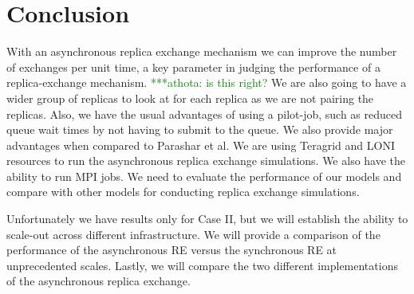 \documentclass[a4paper,10pt]{article}
\newcommand{\jhanote}[1]{ {\textcolor{red} { ***shantenu: #1 }}}
\newcommand{\athotanote}[1]{ {\textcolor{green} { ***athota: #1 }}}
\newcommand{\jhanote}[1]{}
\newcommand{\athotanote}[1]{}
\begin{document}
\section{Conclusion}
With an asynchronous replica exchange mechanism we can improve the number of exchanges per unit time, 
a key parameter in judging the performance of a replica-exchange mechanism. \athotanote{is this right? } 
We are also going to have a wider group of replicas to look at for each replica as we are not pairing 
the replicas. Also, we have the usual advantages of using a pilot-job, such as reduced queue wait 
times by not having to submit to the queue. 
We also provide major advantages when compared to Parashar et al. We are using Teragrid and LONI resources to run the asynchronous replica exchange simulations. We also have the ability to run MPI jobs. We need to evaluate the performance of our models and compare with other models for conducting replica exchange simulations. 

Unfortunately we have results only for Case II, but we will establish the ability to scale-out across different infrastructure. We will provide a comparison of the performance of the asynchronous RE versus the synchronous RE at unprecedented scales. Lastly, we will compare the two different implementations of the asynchronous replica exchange.


 
  
 
\end{document}
